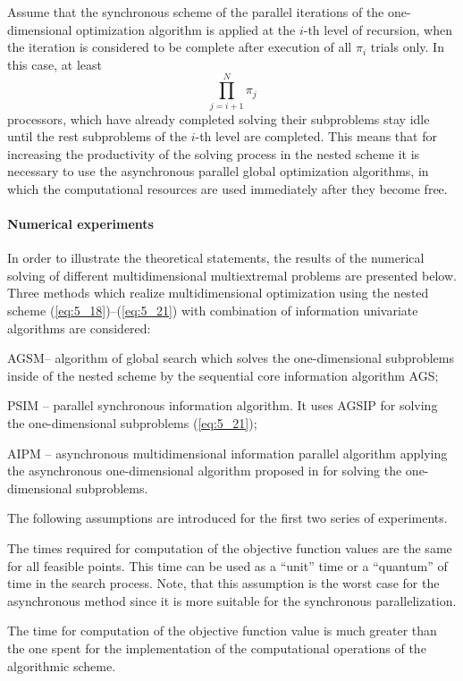 Assume that the synchronous scheme of the parallel iterations of the one-dimensional optimization algorithm is applied at the $i$-th level of recursion, when the iteration is considered to be complete after execution of all $\pi_i$   trials only. In this case, at least 
\begin{displaymath}
\prod_{j=i+1}^N{\pi_j}
\end{displaymath}
processors, which have already completed solving their subproblems stay idle until the rest subproblems of the $i$-th level are completed. This means that for increasing the productivity of the solving process in the nested scheme it is necessary to use the asynchronous parallel global optimization algorithms, in which the computational resources are used immediately after they become free.

\paragraph{Numerical experiments}

In order to illustrate the theoretical statements, the results of the numerical solving of different multidimensional multiextremal problems are presented below. Three methods which realize multidimensional optimization using the nested scheme (\ref{eq:5_18})--(\ref{eq:5_21}) with combination of information univariate algorithms are considered:
\begin{description} [1)]
\item [1)] {AGSM– algorithm of global search which solves the one-dimensional subproblems inside of the nested scheme by the sequential core information algorithm AGS;}
\item [2)] {PSIM – parallel synchronous information algorithm. It uses AGSIP for solving the one-dimensional subproblems (\ref{eq:5_21});}
\item [3)] {AIPM – asynchronous multidimensional information parallel algorithm applying the asynchronous one-dimensional algorithm proposed in \cite{5_SergGriJCAA} for solving the one-dimensional subproblems.}
\end{description}

The following assumptions are introduced for the first two series of experiments.
\begin{description} [i)]
\item [i)] {The times required for computation of the objective function values are the same for all feasible points. This time can be used as a “unit” time or a “quantum” of time  in the search process. Note, that this assumption is the worst case for the asynchronous method since it is more suitable for the synchronous parallelization.}
\item [ii)] {The time for computation of the objective function value is much greater than the one spent for the implementation of the computational operations of the algorithmic scheme.}
\end{description}

